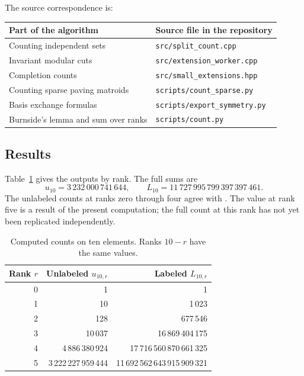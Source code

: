 \documentclass[11pt]{article}
\theoremstyle{definition}
\newcounter{algorithm}
\newcommand{\uFive}{3\,222\,227\,959\,444}
\newcommand{\uTen}{3\,232\,000\,741\,644}
\begin{document}
The source correspondence is:
\begin{center}
\small
\begin{tabular}{@{}ll@{}}
\toprule
Part of the algorithm & Source file in the repository\\
\midrule
Counting independent sets & \texttt{src/split\_count.cpp}\\
Invariant modular cuts & \texttt{src/extension\_worker.cpp}\\
Completion counts & \texttt{src/small\_extensions.hpp}\\
Counting sparse paving matroids & \texttt{scripts/count\_sparse.py}\\
Basis exchange formulas & \texttt{scripts/export\_symmetry.py}\\
Burnside's lemma and sum over ranks & \texttt{scripts/count.py}\\
\bottomrule
\end{tabular}
\end{center}

\subsection{Results}

Table~\ref{tab:ranks} gives the outputs by rank. The full sums are
\begin{equation}\label{eq:totals}
\boxed{u_{10}=\uTen},\qquad
\boxed{L_{10}=11\,727\,995\,799\,397\,397\,461}.
\end{equation}
The unlabeled counts at ranks zero through four agree with
\cite[Table 1]{MMIB}. The value at rank five is a result of the present
computation; the full count at this rank has not yet been replicated
independently.

\begin{table}[htbp]
\centering
\caption{Computed counts on ten elements. Ranks $10-r$ have the same values.}
\label{tab:ranks}
\begin{tabular}{@{}rrr@{}}
\toprule
Rank $r$ & Unlabeled $u_{10,r}$ & Labeled $L_{10,r}$\\
\midrule
0 & 1 & 1\\
1 & 10 & 1\,023\\
2 & 128 & 677\,546\\
3 & 10\,037 & 16\,869\,404\,175\\
4 & 4\,886\,380\,924 & 17\,716\,560\,870\,661\,325\\
5 & \uFive & 11\,692\,562\,643\,915\,909\,321\\
\bottomrule
\end{tabular}
\end{table}
\end{document}
